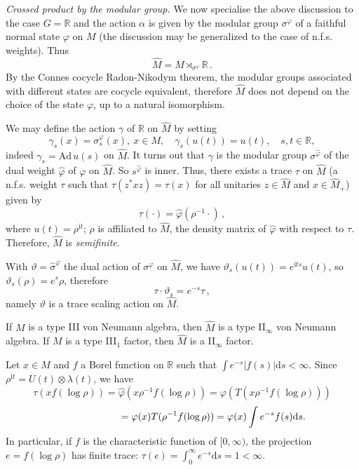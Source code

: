 \documentclass[11pt,a4paper]{article}
\def\s{{s}}
\def\be{\begin{equation}}
\def\ee{\end{equation}}
\def\hat{\widehat}
\def\i{{\mathrm i}}
\def\hat{\widehat}
\def\Ad{{\mathrm {Ad}}}
\def\f{\varphi}
\def\al{\alpha}
\begin{document}
\smallskip

\noindent
{\it Crossed product by the modular group.} We now specialise the above discussion to the case $G = \mathbb R$ and the action $\al$ is given by the modular group $\sigma^\f$ of a faithful normal state $\f$ on $M$  (the discussion may be generalized to the case of n.f.s. weights). Thus
\be
\hat M = M\rtimes_{\sigma^\f} \mathbb R\, .
\ee
By the Connes cocycle Radon-Nikodym theorem, the modular groups associated with different states are cocycle equivalent, therefore $\hat M$ does not depend on the choice of the state $\f$, up to a natural isomorphism. 

We may define the action $\gamma$ of $\mathbb R$ on $\hat M$ by setting
\be
\gamma_s(x) = \sigma^\f_s(x),\ x\in M,\quad \gamma_s(u(t)) = u(t),\quad s,t\in \mathbb R,
\ee
indeed $\gamma_s =\Ad \,u(s)$ on $\hat M$. It turns out that $\gamma$ is the modular group $\sigma^{\hat \f}$ of the dual weight $\hat \f$ of $\f$ on $\hat M$. So $\s^{\hat\f}$ is inner. Thus, there exists a trace $\tau$ on $\hat M$ (a n.f.s. weight $\tau$ such that $\tau(z^* x z) = \tau(x)$ for all unitaries $z\in \hat M$ and $x\in \hat M_+$) given by
\be
\tau(\cdot) = \hat\f(\rho^{-1}\cdot) \, ,
\ee
where $u(t) = \rho^{\i t}$;  $\rho$ is affiliated to $\hat M$, the density matrix of $\hat \f$ with respect to $\tau$. 
Therefore, $\hat M$ is {\it semifinite}. 

With $\vartheta = \hat \sigma^\varphi$ the dual action of $\sigma^\varphi$ on $\hat M$, we have $\vartheta_s (u(t))= e^{\i ts} u(t)$, 
so $\vartheta_s (\rho) = e^{s} \rho$, therefore
\be
\tau\cdot\vartheta_s = e^{-s} \tau\, ,
\ee
namely $\vartheta$ is a trace scaling action on $\hat M$. 

If $M$ is a type III von Neumann algebra, then $\hat M$ is a type II$_\infty$ von Neumann algebra. If $M$ is a type III$_1$ factor, then $\hat M$ is a II$_\infty$ factor. 

Let $x\in M$ and $f$ a Borel function on $\mathbb R$ such that $\int e^{-s}| f(s)|{\mathrm d}s < \infty$. Since $\rho^{\i t} = U(t)\otimes \lambda(t)$, we have
\be
\tau(x f(\log\rho)) = \hat \f(x \rho^{-1} f(\log\rho))  
=   \f(T(x \rho^{-1} f(\log\rho))) \ee
\be\notag
~~~~~~~~~~~~~~~~~~~=   \f(x)T( \rho^{-1} f(\log\rho))= \f(x)\int e^{-s}  f(s){\mathrm d}s.
\ee
In particular, if $ f$ is the characteristic function of $[0,\infty)$, the projection $e = f(\log\rho)$ has finite trace: $\tau(e) = \int_0^\infty e^{-s}{\mathrm d}s = 1 < \infty$. 
\end{document}
